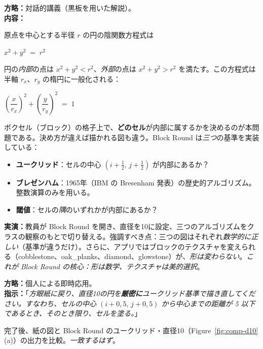 \documentclass[12pt,a4paper]{scrartcl}
\newcommand{\acc}[1]{\textcolor{accent}{\textbf{#1}}}
\newcommand{\tempo}[1]{\textnormal{\footnotesize\color{bg!90!white}\textsf{#1}}}
\begin{document}
\begin{katsudou}[1.3 --- 体系化 \quad\tempo{15分}]
\textbf{方略：}対話的講義（黒板を用いた解説）。 \\[0.4em]
\textbf{内容：}

原点を中心とする半径 $r$ の円の陰関数方程式は

\begin{shiki}
\centering
$\displaystyle x^2 + y^2 \;=\; r^2$
\end{shiki}

円の\emph{内部}の点は $x^2 + y^2 < r^2$、\emph{外部}の点は $x^2 + y^2 > r^2$ を満たす。この方程式は半軸 $r_x$、$r_y$ の楕円に一般化される：

\begin{shiki}
\centering
$\displaystyle \left(\dfrac{x}{r_x}\right)^{\!2} + \left(\dfrac{y}{r_y}\right)^{\!2} \;=\; 1$
\end{shiki}

ボクセル（ブロック）の格子上で、\acc{どのセル}が内部に属するかを決めるのが本問題である。決め方が違えば描かれる図も違う。Block Round は\emph{三つ}の基準を実装している：

\begin{itemize}[leftmargin=1.3em,itemsep=0.15em,topsep=0.3em]
  \item \acc{ユークリッド}：セルの中心 $(i + \tfrac{1}{2},\, j + \tfrac{1}{2})$ が内部にあるか？
  \item \acc{ブレゼンハム}：1965年（IBM の Bresenham 発表）の歴史的アルゴリズム。整数演算のみを用いる。
  \item \acc{閾値}：セルの\emph{隅}のいずれかが内部にあるか？
\end{itemize}

\textbf{実演：}教員が Block Round を開き、直径を10に設定、三つのアルゴリズムをクラスの観察のもとで切り替える。強調すべき点：三つの図はそれぞれ\emph{数学的に正しい}（基準が違うだけ）。さらに、アプリではブロックのテクスチャを変えられる（cobblestone、oak\_planks、diamond、glowstone）が、\emph{形は変わらない}。\emph{これが Block Round の核心：形は数学、テクスチャは美的選択}。
\end{katsudou}

\begin{katsudou}[1.4 --- 統合 \quad\tempo{10分}]
\textbf{方略：}個人による即時応用。 \\[0.4em]
\textbf{指示：}「\emph{方眼紙に戻り、直径10の円を\acc{厳密に}ユークリッド基準で描き直してください。すなわち、セルの中心 $(i + 0{,}5,\, j + 0{,}5)$ から中心までの距離が 5 以下であるとき、そのとき限り、セルを塗る。}」

完了後、紙の図と Block Round のユークリッド・直径10（Figure~\ref{fig:comp-d10}(a)）の出力を比較。\emph{一致するはず}。
\end{katsudou}
\end{document}
